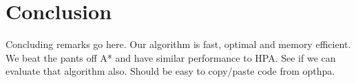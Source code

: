 \section{Conclusion}
Concluding remarks go here.
Our algorithm is fast, optimal and memory efficient. 
We beat the pants off A* and have similar performance to HPA. 
See if we can evaluate that algorithm also. 
Should be easy to copy/paste code from opthpa.
